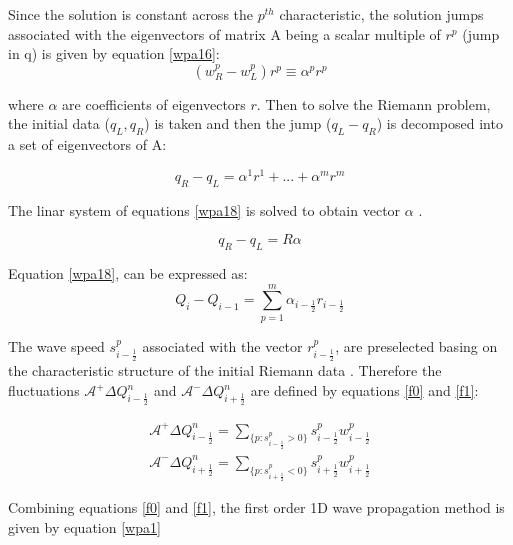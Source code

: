 \documentclass[12pt,a4paper]{article}
\begin{document}
	\noindent Since the solution is constant across the $p^{th}$ characteristic, the solution jumps associated with the eigenvectors of matrix A being a scalar multiple of $r^{p}$ (jump in q) is given by equation \eqref{wpa16}:
	\begin{equation}
		(w_{R}^{p} - w_{L}^{p}) r^{p} \equiv \alpha^{p}r^{p}
		\label{wpa16}
	\end{equation}

	\noindent where $\alpha$ are coefficients of eigenvectors $r$. Then to solve the Riemann problem, the initial data ($q_{L},q_{R}$) is taken and then the jump ($q_{L} - q_{R}$) is decomposed into a set of  eigenvectors of A:
	
	\begin{equation}
		q_{R} - q_{L} = \alpha^{1}r^{1} + ... + \alpha^{m}r^{m}
		\label{wpa17}
	\end{equation}
	
	\noindent The linar system of equations \eqref{wpa18}  is solved to obtain vector $\alpha$ .
	
		\begin{equation}
		q_{R} - q_{L} = R \alpha
		\label{wpa18}
	\end{equation}
	
	\noindent Equation \eqref{wpa18}, can be expressed as:
		\begin{equation}
		Q_{i} -  Q_{i-1} = \sum_{p=1}^{m}  \alpha_{i-\frac{1}{2}} r_{i-\frac{1}{2}}
		\label{wpa19}
	\end{equation}

	\noindent The wave speed $s_{i-\frac{1}{2}}^{p}$ associated with the vector $r_{i-\frac{1}{2}}^{p}$, are preselected basing on the characteristic structure of the initial Riemann data \cite{ge:2008}. Therefore the fluctuations $\mathcal{A^{+}}\Delta Q_{i-\frac{1}{2}}^{n}$  and $\mathcal{A^{-}}\Delta Q_{i+\frac{1}{2}}^{n} $ are defined by equations \eqref{f0} and \eqref{f1}:
   
   \begin{eqnarray}
   	\mathcal{A^{+}}\Delta Q_{i-\frac{1}{2}}^{n} = \sum_{\{ p:s_{i-\frac{1}{2}}^{p}>0\}} s_{i-\frac{1}{2}}^{p} w_{i-\frac{1}{2}}^{p}
   	\label{f0}\\
   		\mathcal{A^{-}}\Delta Q_{i+\frac{1}{2}}^{n} = \sum_{\{ p:s_{i+\frac{1}{2}}^{p}<0\}} s_{i+\frac{1}{2}}^{p} w_{i+\frac{1}{2}}^{p}
   		\label{f1}
   \end{eqnarray}
   
   
   \noindent Combining equations \eqref{f0} and \eqref{f1}, the  first order 1D  wave propagation method is given by equation \eqref{wpa1}
	
\end{document}
